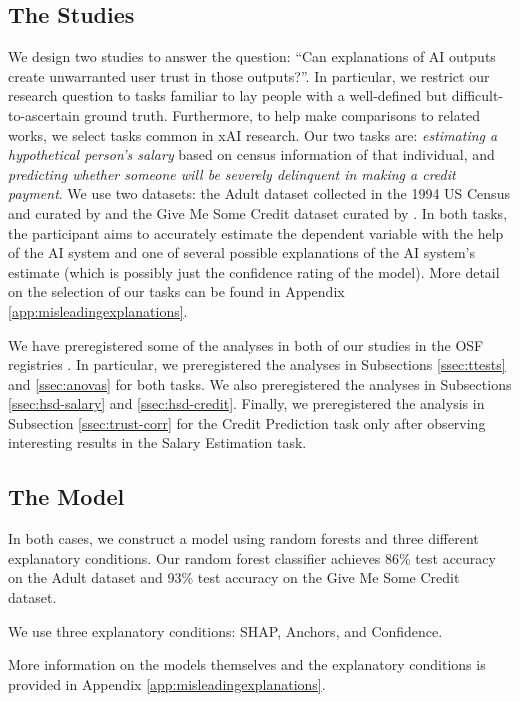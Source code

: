 \subsection{The Studies}
We design two studies to answer the question: ``Can explanations of AI outputs create unwarranted user trust in those outputs?''. In particular, we restrict our research question to tasks familiar to lay people with a well-defined but difficult-to-ascertain ground truth. Furthermore, to help make comparisons to related works, we select tasks common in xAI research. Our two tasks are: \emph{estimating a hypothetical person's salary} based on census information of that individual, and \emph{predicting whether someone will be severely delinquent in making a credit payment}. We use two datasets: the Adult dataset collected in the 1994 US Census and curated by \textcite{kohavi_scaling_1996} and the Give Me Some Credit dataset curated by \textcite{GiveMeSomeCredit}. In both tasks, the participant aims to accurately estimate the dependent variable with the help of the AI system and one of several possible explanations of the AI system's estimate (which is possibly just the confidence rating of the model). More detail on the selection of our tasks can be found in Appendix \ref{app:misleadingexplanations}.

We have preregistered some of the analyses in both of our studies in the OSF registries \cite{natarajan_binns_2022}. In particular, we preregistered the analyses in Subsections \ref{ssec:ttests} and \ref{ssec:anovas} for both tasks. We also preregistered the analyses in Subsections \ref{ssec:hsd-salary} and \ref{ssec:hsd-credit}. Finally, we preregistered the analysis in Subsection \ref{ssec:trust-corr} for the Credit Prediction task only after observing interesting results in the Salary Estimation task.

\subsection{The Model}
In both cases, we construct a model using random forests and three different explanatory conditions. Our random forest classifier achieves 86\% test accuracy on the Adult dataset and 93\% test accuracy on the Give Me Some Credit dataset.

We use three explanatory conditions: SHAP, Anchors, and Confidence. 

More information on the models themselves and the explanatory conditions is provided in Appendix \ref{app:misleadingexplanations}. 

